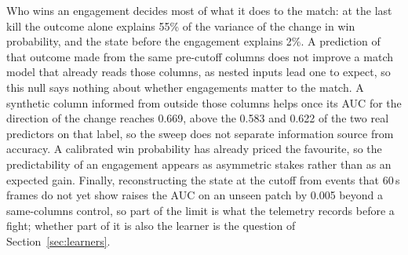 Who wins an engagement decides most of what it does to the match: at the last kill the outcome alone
explains 55\% of the variance of the change in win probability, and the state before the engagement
explains 2\%. A prediction of that outcome made from the same pre-cutoff columns does not improve a match
model that already reads those columns, as nested inputs lead one to expect, so this null says nothing
about whether engagements matter to the match. A synthetic column informed from outside those columns
helps once its AUC for the direction of the change reaches 0.669, above the 0.583 and 0.622 of the two
real predictors on that label, so the sweep does not separate information source from accuracy. A
calibrated win probability has
already priced the favourite, so the predictability of an engagement appears as asymmetric stakes rather
than as an expected gain. Finally, reconstructing the state at the cutoff from events that 60\,s frames
do not yet show raises the AUC on an unseen patch by 0.005 beyond a same-columns control, so part of the
limit is what the telemetry records before a fight; whether part of it is also the learner is the
question of Section~\ref{sec:learners}.

